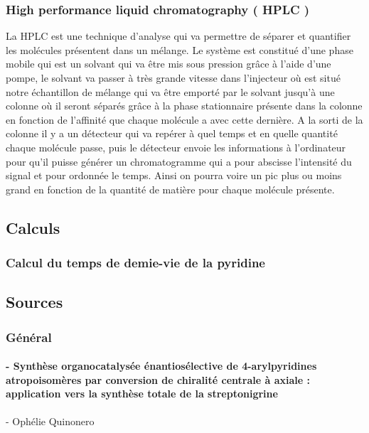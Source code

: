 \documentclass{article}
\begin{document}
\subsubsection{High performance liquid chromatography ( HPLC )}


La HPLC est une technique d’analyse qui va permettre de séparer et quantifier les molécules présentent dans un mélange. Le système est constitué d’une phase mobile qui est un solvant qui va être mis sous pression grâce à l’aide d’une pompe, le solvant va passer à très grande vitesse dans l’injecteur où est situé notre échantillon de mélange qui va être emporté par le solvant jusqu’à une colonne où il seront séparés grâce à la phase stationnaire présente dans la colonne en fonction de l’affinité que chaque molécule a avec cette dernière. A la sorti de la colonne il y a un détecteur qui va repérer à quel temps et en quelle quantité chaque molécule passe, puis le détecteur envoie les informations à l’ordinateur pour qu’il puisse générer un chromatogramme qui a pour abscisse l’intensité du signal et pour ordonnée  le temps. Ainsi on pourra voire un pic plus ou moins grand en fonction de la quantité de matière pour chaque molécule présente.



\medbreak

\subsection{Calculs}

\subsubsection*{Calcul du temps de demie-vie de la pyridine}

\newpage

\subsection{Sources}

\subsubsection*{Général}


\paragraph{- \quad Synthèse organocatalysée énantiosélective de 4-arylpyridines atropoisomères par conversion de chiralité centrale à axiale : application vers la synthèse totale de la streptonigrine} - Ophélie Quinonero
\end{document}
